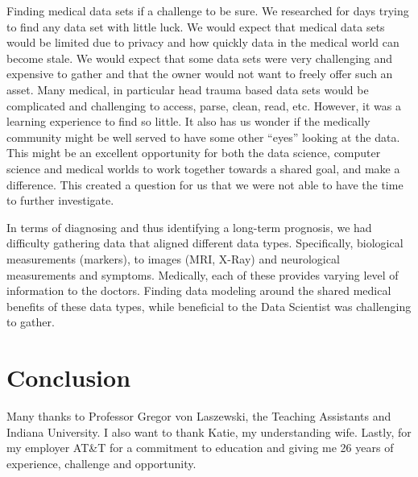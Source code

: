 \documentclass[sigconf]{acmart}
\begin{document}
Finding medical data sets if a challenge to be sure.  We researched for days trying to find any data set with little luck.  We would expect that medical data sets would be limited due to privacy and how quickly data in the medical world can become stale.  We would expect that some data sets were very challenging and expensive to gather and that the owner would not want to freely offer such an asset.  Many medical, in particular head trauma based data sets would be complicated and challenging to access, parse, clean, read, etc.  However, it was a learning experience to find so little.  It also has us wonder if the medically community might be well served to have some other ``eyes'' looking at the data.  This might be an excellent opportunity for both the data science, computer science and medical worlds to work together towards a shared goal, and make a difference.  This created a question for us that we were not able to have the time to further investigate.  

In terms of diagnosing and thus identifying a long-term prognosis, we had difficulty gathering data that aligned different data types.  Specifically, biological measurements (markers), to images (MRI, X-Ray) and neurological measurements and symptoms.  Medically, each of these provides varying level of information to the doctors.  Finding data modeling around the shared medical benefits of these data types, while beneficial to the Data Scientist was challenging to gather. 



\section{Conclusion}




\begin{acks}

Many thanks to Professor Gregor von Laszewski, the Teaching Assistants and Indiana University.  I also want to thank Katie, my understanding wife.  Lastly, for my employer AT\&T for a commitment to education and giving me 26 years of experience, challenge and opportunity.

\end{acks}




 
\end{document}
